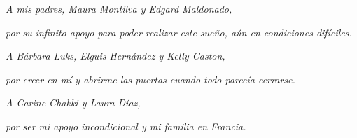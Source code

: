 \pagebreak


\begin{flushright} 
\textit{A mis padres, Maura Montilva y Edgard Maldonado,}

\textit{por su infinito apoyo para poder realizar este sueño, aún en condiciones difíciles.}

\textit{ }

\textit{A Bárbara Luks, Elguis Hernández y Kelly Caston,}

\textit{por creer en mí y abrirme las puertas cuando todo parecía cerrarse.}

\textit{ }

\textit{A Carine Chakki y Laura Díaz,}

\textit{por ser mi apoyo incondicional y mi familia en Francia.}

\end{flushright}
\newpage
